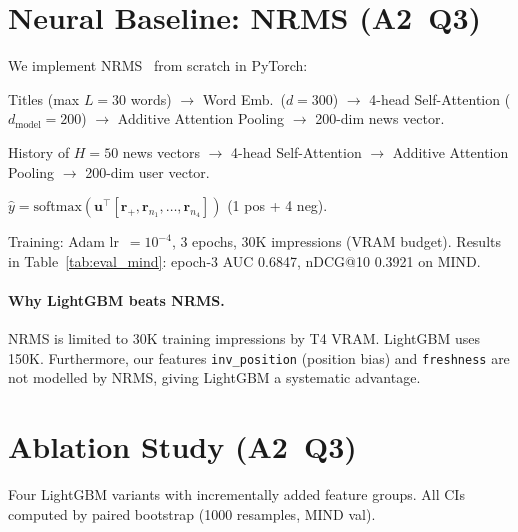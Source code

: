 \documentclass[11pt,a4paper]{article}
\newcommand{\feature}[1]{\texttt{#1}}
\begin{document}
\section{Neural Baseline: NRMS (A2~Q3)}

We implement NRMS~\citep{wu2019neural} from scratch in PyTorch:
\begin{description}[noitemsep]
  \item[News Encoder.] Titles (max $L{=}30$ words) $\to$ Word Emb.\ ($d{=}300$)
        $\to$ 4-head Self-Attention ($d_{\text{model}}{=}200$) $\to$ Additive
        Attention Pooling $\to$ 200-dim news vector.
  \item[User Encoder.] History of $H{=}50$ news vectors $\to$ 4-head
        Self-Attention $\to$ Additive Attention Pooling $\to$ 200-dim user
        vector.
  \item[Scorer.] $\hat{y} = \text{softmax}(\mathbf{u}^\top [\mathbf{r}_+,
        \mathbf{r}_{n_1},\ldots,\mathbf{r}_{n_4}])$ (1 pos + 4 neg).
\end{description}

Training: Adam lr~$=10^{-4}$, 3 epochs, 30K impressions (VRAM budget). Results
in Table~\ref{tab:eval_mind}: epoch-3 AUC 0.6847, nDCG@10 0.3921 on MIND.

\paragraph{Why LightGBM beats NRMS.} NRMS is limited to 30K training
impressions by T4 VRAM. LightGBM uses 150K. Furthermore, our features
\feature{inv\_position} (position bias) and \feature{freshness} are not modelled
by NRMS, giving LightGBM a systematic advantage.

\section{Ablation Study (A2~Q3)}

Four LightGBM variants with incrementally added feature groups. All CIs computed
by paired bootstrap (1000 resamples, MIND val).
\end{document}
